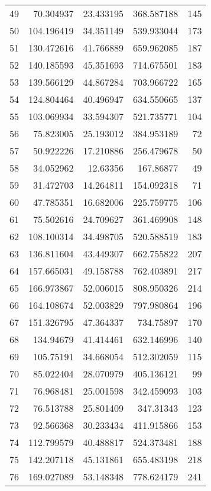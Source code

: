 \documentclass[dvipsnames, svgnames,a4paper,11pt]{article}
\begin{document}
\begin{longtable}{|r|r|r|r|r|}
	49 & 70.304937  & 23.433195   & 368.587188 & 145 \\
	50 & 104.196419 & 34.351149   & 539.933044 & 173 \\
	51 & 130.472616 & 41.766889   & 659.962085 & 187 \\
	52 & 140.185593 & 45.351693   & 714.675501 & 183 \\
	53 & 139.566129 & 44.867284   & 703.966722 & 165 \\
	54 & 124.804464 & 40.496947   & 634.550665 & 137 \\
	55 & 103.069934 & 33.594307   & 521.735771 & 104 \\
	56 & 75.823005  & 25.193012   & 384.953189 & 72  \\
	57 & 50.922226  & 17.210886   & 256.479678 & 50  \\
	58 & 34.052962  & 12.63356    & 167.86877   & 49  \\
	59 & 31.472703  & 14.264811   & 154.092318 & 71  \\
	60 & 47.785351  & 16.682006   & 225.759775 & 106 \\
	61 & 75.502616  & 24.709627   & 361.469908 & 148 \\
	62 & 108.100314 & 34.498705   & 520.588519 & 183 \\
	63 & 136.811604 & 43.449307   & 662.755822 & 207 \\
	64 & 157.665031  & 49.158788   & 762.403891 & 217 \\
	65 & 166.973867 & 52.006015   & 808.950326 & 214 \\
	66 & 164.108674 & 52.003829   & 797.980864 & 196 \\
	67 & 151.326795 & 47.364337   & 734.75897   & 170  \\
	68 & 134.94679  & 41.414461   & 632.146996  & 140 \\
	69 & 105.75191  & 34.668054   & 512.302059  & 115 \\
	70 & 85.022404  & 28.070979   & 405.136121  & 99  \\
	71 & 76.968481  & 25.001598   & 342.459093  & 103 \\
	72 & 76.513788   & 25.801409   & 347.31343   & 123 \\
	73 & 92.566368   & 30.233434   & 411.915866 & 153 \\
	74 & 112.799579   & 40.488817   & 524.373481 & 188  \\
	75 & 142.207118   & 45.131861   & 655.483198 & 218 \\
	76 & 169.027089   & 53.148348   & 778.624179  & 241 \\

\end{longtable}
\end{document}
